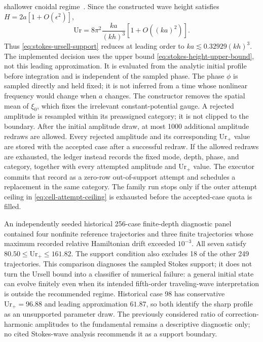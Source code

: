 \documentclass[11pt]{article}
\begin{document}
shallower cnoidal regime~\cite{zhao2024}.  Since the constructed wave height
satisfies $H=2a[1+O(\epsilon^2)]$,
\begin{equation}
  \mathrm{Ur}
  =
  8\pi^2\frac{ka}{(kh)^3}[1+O((ka)^2)].
  \label{eq:stokes-ursell-leading}
\end{equation}
Thus \eqref{eq:stokes-ursell-support} reduces at leading order to
$ka\lesssim0.32929(kh)^3$.  The implemented decision uses the upper bound
\eqref{eq:stokes-height-upper-bound}, not this leading approximation.  It is
evaluated from the analytic initial profile before integration and is
independent of the sampled phase.  The phase $\phi$ is sampled directly and
held fixed; it is not inferred from a time whose nonlinear frequency would
change when $a$ changes.  The constructor removes the spatial mean of
$\xi_0$, which fixes the irrelevant constant-potential gauge.
A rejected amplitude is resampled within
its preassigned category; it is not clipped to the boundary.  After the initial
amplitude draw, at most 1000 additional amplitude redraws are allowed.  Every rejected
amplitude and its corresponding $\mathrm{Ur}_+$ value are stored with the
accepted case after a successful redraw.  If the allowed redraws are
exhausted, the ledger instead records the fixed mode, depth, phase, and category,
together with every attempted amplitude and $\mathrm{Ur}_+$ value.  The
executor commits that record as a zero-row out-of-support attempt and
schedules a replacement in the same category.  The family run stops only if the
outer attempt ceiling in \eqref{eq:cell-attempt-ceiling} is exhausted before
the accepted-case quota is filled.

An independently seeded historical 256-case finite-depth diagnostic panel
contained four nonfinite reference trajectories and three finite trajectories
whose maximum recorded relative Hamiltonian drift exceeded \(10^{-3}\).  All
seven satisfy
$80.50\leq\mathrm{Ur}_+\leq161.82$.  The support condition also excludes 18
of the other 249 trajectories.  This comparison diagnoses the sampled
Stokes support; it does not turn the Ursell bound into a classifier of
numerical failure:
a general initial state can evolve finitely even when its intended
fifth-order traveling-wave interpretation is outside the recommended
regime.  Historical case 98 has conservative
$\mathrm{Ur}_+=96.88$ and leading
approximation $61.87$, so both identify the sharp profile as an unsupported
parameter draw.  The previously considered ratio of correction-harmonic
amplitudes to the fundamental remains a descriptive diagnostic only; no cited
Stokes-wave analysis recommends it as a support boundary.
\end{document}
